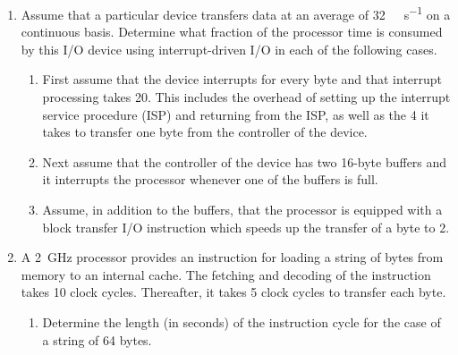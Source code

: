 \documentclass[12pt]{article}
\begin{document}

	\begin{enumerate}[itemsep=3em]
		\item{Assume that a particular device transfers data at an average of \SI{32}{\kilo\byte\per\s} on a continuous basis. Determine what fraction of the processor time is consumed by this I/O device using interrupt-driven I/O in each of the following cases.}\\	
		\begin{enumerate}[itemsep=3em]
			\item{First assume that the device interrupts for every byte and that interrupt processing takes \SI{20}{\mics}.  This includes the overhead of setting up the interrupt service procedure (ISP) and returning from the ISP, as well as the \SI{4}{\mics} it takes to transfer one byte from the controller of the device.}\\
			\fbox{\parbox{\textwidth}{
			
			}}
			
			\item{ Next assume that the controller of the device has two 16-byte buffers and it interrupts the processor whenever one of the buffers is full.}\\
			\fbox{\parbox{\textwidth}{
			
			}}
		
			\item{Assume, in addition to the buffers, that the processor is equipped with a block transfer I/O instruction which speeds up the transfer of a byte to \SI{2}{\mics}.}\\
			\fbox{\parbox{\textwidth}{
			
			}}

		\end{enumerate}
	
		\item{A \SI{2}{\giga \hertz} processor provides an instruction for loading a string of bytes from memory to an internal cache. The fetching and decoding of the instruction takes 10 clock cycles. Thereafter, it takes 5 clock cycles to transfer each byte.}\\
		\begin{enumerate}[itemsep=3em]
			\item{Determine the length (in seconds) of the instruction cycle for the case of a string of 64 bytes.}\\
			\fbox{\parbox{\textwidth}{
			
}}
\end{enumerate}
\end{enumerate}
\end{document}
